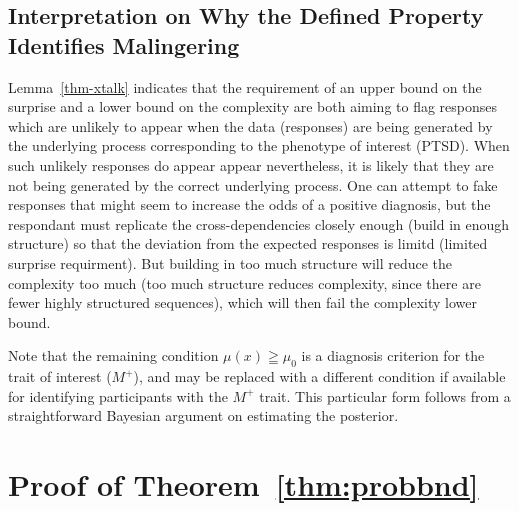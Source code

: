 \documentclass[onecolumn,10pt]{IEEEtran}
\begin{document}
\subsection*{Interpretation on Why the Defined Property Identifies Malingering}

Lemma~\ref{thm-xtalk} indicates that the requirement of  an upper bound on the surprise  and a lower bound on the complexity  are  both aiming to flag responses which are   unlikely to appear when the data (responses) are being generated by the  underlying process  corresponding to the phenotype of interest (PTSD).   When such unlikely responses do appear appear nevertheless, it is likely that they  are not being generated by the correct underlying process.  One can attempt to fake responses that might seem to increase the odds of a positive diagnosis, but the respondant must replicate the cross-dependencies closely enough (build in enough structure) so that the deviation from the expected responses is limitd (limited surprise requirment). But building in too much structure will reduce the complexity too much (too much structure reduces complexity, since there are fewer highly structured sequences), which will then fail the complexity lower bound.

Note that the remaining condition $\mu(x) \geqq \mu_0$ is a diagnosis criterion for the trait of interest ($M^+$), and may be replaced with a different condition if available for identifying participants with  the $M^+$ trait. This particular form follows from a straightforward Bayesian argument on estimating the posterior.

\section{Proof of Theorem~\ref{thm:probbnd}}\label{secproof}
\end{document}
